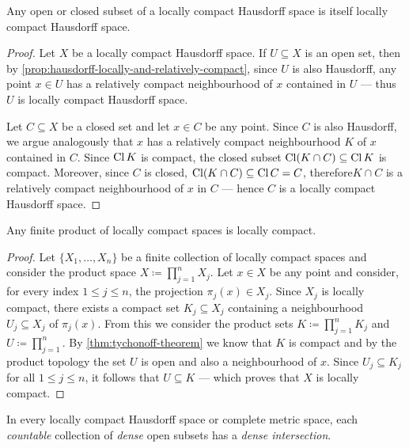 \begin{proposition}
\label{prop:subset-loc-cpct-hausdorff}
Any open or closed subset of a locally compact Hausdorff space is itself locally
compact Hausdorff space.
\end{proposition}

\begin{proof}
Let \(X\) be a locally compact Hausdorff space. If \(U \subseteq X\) is an open
set, then by \cref{prop:hausdorff-locally-and-relatively-compact}, since \(U\)
is also Hausdorff, any point \(x \in U\) has a relatively compact neighbourhood
of \(x\) contained in \(U\) --- thus \(U\) is locally compact Hausdorff space.

Let \(C \subseteq X\) be a closed set and let \(x \in C\) be any point. Since
\(C\) is also Hausdorff, we argue analogously that \(x\) has a relatively
compact neighbourhood \(K\) of \(x\) contained in \(C\). Since \(\operatorname{Cl} K\) is
compact, the closed subset \(\operatorname{Cl}(K \cap C) \subseteq \operatorname{Cl} K\) is
compact. Moreover, since \(C\) is closed, \(\operatorname{Cl}(K \cap C) \subseteq \operatorname{Cl} C = C\),
therefore\(K \cap C\) is a relatively compact neighbourhood of \(x\) in \(C\)
--- hence \(C\) is a locally compact Hausdorff space.
\end{proof}

\begin{lemma}
\label{lem:product-loc-cpct}
Any finite product of locally compact spaces is locally compact.
\end{lemma}

\begin{proof}
Let \(\{X_1, \dots, X_n\}\) be a finite collection of locally compact spaces and
consider the product space \(X \coloneq \prod_{j=1}^n X_j\). Let \(x \in X\) be
any point and consider, for every index \(1 \leq j \leq n\), the projection
\(\pi_j(x) \in X_j\). Since \(X_j\) is locally compact, there exists a compact
set \(K_j \subseteq X_j\) containing a neighbourhood \(U_j \subseteq X_j\) of
\(\pi_j(x)\). From this we consider the product sets
\(K \coloneq \prod_{j=1}^n K_j\) and \(U \coloneq \prod_{j=1}^n\). By
\cref{thm:tychonoff-theorem} we know that \(K\) is compact and by the product
topology the set \(U\) is open and also a neighbourhood of \(x\). Since
\(U_j \subseteq K_j\) for all \(1 \leq j \leq n\), it follows that
\(U \subseteq K\) --- which proves that \(X\) is locally compact.
\end{proof}

\begin{theorem}
\label{thm:baire-category}
In every locally compact Hausdorff space or complete metric space, each
\emph{countable} collection of \emph{dense} open subsets has a \emph{dense
  intersection}.
\end{theorem}

